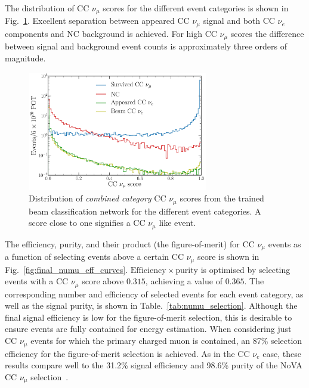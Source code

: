 The distribution of CC $\nu_{\mu}$ scores for the different event categories is shown in
Fig.~\ref{fig:final_beam_numu_outputs}. Excellent separation between appeared CC $\nu_{\mu}$
signal and both CC $\nu_{e}$ components and NC background is achieved. For high CC $\nu_{\mu}$
scores the difference between signal and background event counts is approximately three orders of
magnitude.

\begin{figure} %
    \includegraphics[width=0.7\textwidth]{diagrams/6-cvn/chipsnet/final_beam_numu_outputs.pdf}
    \caption[Distribution of CC $\nu_{\mu}$ scores from the trained beam classification network.]
    {Distribution of \emph{combined category} CC $\nu_{\mu}$ scores from the trained beam
        classification network for the different event categories. A score close to one signifies
        a CC $\nu_{\mu}$ like event.}
    \label{fig:final_beam_numu_outputs}
\end{figure}

The efficiency, purity, and their product (the figure-of-merit) for CC $\nu_{\mu}$ events as a
function of selecting events above a certain CC $\nu_{\mu}$ score is shown in
Fig.~\ref{fig:final_numu_eff_curves}. $\mathrm{Efficiency}\times\mathrm{purity}$ is optimised by
selecting events with a CC $\nu_{\mu}$ score above $0.315$, achieving a value of $0.365$. The
corresponding number and efficiency of selected events for each event category, as well as the
signal purity, is shown in Table.~\ref{tab:numu_selection}. Although the final signal efficiency
is low for the figure-of-merit selection, this is desirable to ensure events are fully contained
for energy estimation. When considering just CC $\nu_{\mu}$ events for which the primary charged
muon is contained, an 87\% selection efficiency for the figure-of-merit selection is achieved. As
in the CC $\nu_{e}$ case, these results compare well to the 31.2\% signal efficiency and 98.6\%
purity of the NoVA CC $\nu_{\mu}$ selection~\cite{acero2019}.

